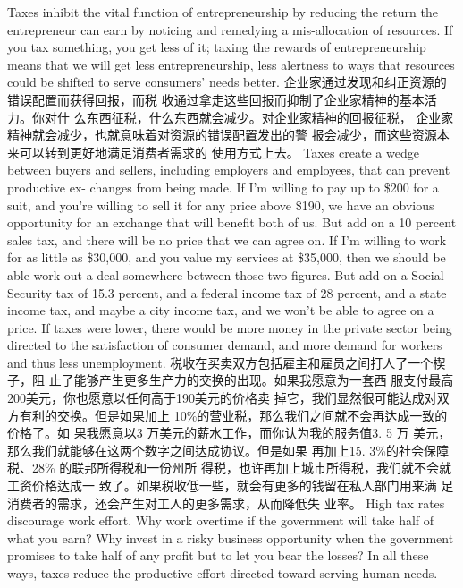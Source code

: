 \begin{paracol}{2}
\switchcolumn*
Taxes inhibit the vital function of entrepreneurship by reducing the return the entrepreneur can earn by noticing and remedying a mis-allocation of resources. If you tax something, you
get less of it; taxing the rewards of entrepreneurship means that
we will get less entrepreneurship, less alertness to ways that resources could be shifted to serve consumers' needs better.
\switchcolumn
企业家通过发现和纠正资源的错误配置而获得回报，而税
收通过拿走这些回报而抑制了企业家精神的基本活力。你对什
么东西征税，什么东西就会减少。对企业家精神的回报征税，
企业家精神就会减少，也就意味着对资源的错误配置发出的警
报会减少，而这些资源本来可以转到更好地满足消费者需求的
使用方式上去。
\switchcolumn*
Taxes create a wedge between buyers and sellers, including
employers and employees, that can prevent productive ex-
changes from being made. If I'm willing to pay up to \$200 for
a suit, and you're willing to sell it for any price above \$190, we
have an obvious opportunity for an exchange that will benefit
both of us. But add on a 10 percent sales tax, and there will be
no price that we can agree on. If I'm willing to work for as little as \$30,000, and you value my services at \$35,000, then we
should be able work out a deal somewhere between those two
figures. But add on a Social Security tax of 15.3 percent, and a
federal income tax of 28 percent, and a state income tax, and
maybe a city income tax, and we won't be able to agree on a
price. If taxes were lower, there would be more money in the
private sector being directed to the satisfaction of consumer
demand, and more demand for workers and thus less unemployment.
\switchcolumn
税收在买卖双方包括雇主和雇员之间打人了一个楔子，阻
止了能够产生更多生产力的交换的出现。如果我愿意为一套西
服支付最高200美元，你也愿意以任何高于190美元的价格卖
掉它，我们显然很可能达成对双方有利的交换。但是如果加上
10\%的营业税，那么我们之间就不会再达成一致的价格了。如
果我愿意以3 万美元的薪水工作，而你认为我的服务值3. 5 万
美元，那么我们就能够在这两个数字之间达成协议。但是如果
再加上15. 3\%的社会保障税、28\% 的联邦所得税和一份州所
得税，也许再加上城市所得税，我们就不会就工资价格达成一
致了。如果税收低一些，就会有更多的钱留在私人部门用来满
足消费者的需求，还会产生对工人的更多需求，从而降低失
业率。
\switchcolumn*
High tax rates discourage work effort. Why work overtime if
the government will take half of what you earn? Why invest in
a risky business opportunity when the government promises to
take half of any profit but to let you bear the losses? In all these
ways, taxes reduce the productive effort directed toward serving
human needs.

\end{paracol}
